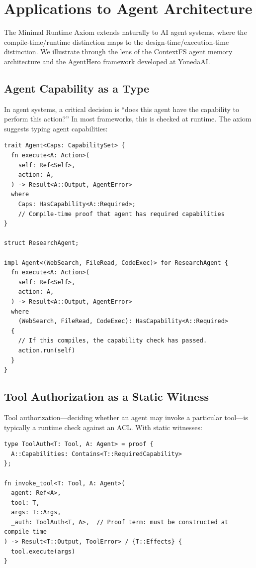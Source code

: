 \documentclass[11pt]{article}
\begin{document}
\section{Applications to Agent Architecture}
\label{sec:agent-arch}

The Minimal Runtime Axiom extends naturally to AI agent systems, where the
compile-time/runtime distinction maps to the design-time/execution-time distinction.
We illustrate through the lens of the ContextFS agent memory architecture and the
AgentHero framework developed at YonedaAI.

\subsection{Agent Capability as a Type}

In agent systems, a critical decision is ``does this agent have the capability to
perform this action?'' In most frameworks, this is checked at runtime. The axiom
suggests typing agent capabilities:

\begin{lstlisting}[caption={Agent capabilities as types in JAPL}]
trait Agent<Caps: CapabilitySet> {
  fn execute<A: Action>(
    self: Ref<Self>,
    action: A,
  ) -> Result<A::Output, AgentError>
  where
    Caps: HasCapability<A::Required>;
    // Compile-time proof that agent has required capabilities
}

struct ResearchAgent;

impl Agent<(WebSearch, FileRead, CodeExec)> for ResearchAgent {
  fn execute<A: Action>(
    self: Ref<Self>,
    action: A,
  ) -> Result<A::Output, AgentError>
  where
    (WebSearch, FileRead, CodeExec): HasCapability<A::Required>
  {
    // If this compiles, the capability check has passed.
    action.run(self)
  }
}
\end{lstlisting}

\subsection{Tool Authorization as a Static Witness}

Tool authorization---deciding whether an agent may invoke a particular tool---is
typically a runtime check against an ACL. With static witnesses:

\begin{lstlisting}[caption={Tool authorization as a static witness}]
type ToolAuth<T: Tool, A: Agent> = proof {
  A::Capabilities: Contains<T::RequiredCapability>
};

fn invoke_tool<T: Tool, A: Agent>(
  agent: Ref<A>,
  tool: T,
  args: T::Args,
  _auth: ToolAuth<T, A>,  // Proof term: must be constructed at compile time
) -> Result<T::Output, ToolError> / {T::Effects} {
  tool.execute(args)
}
\end{lstlisting}
\end{document}

